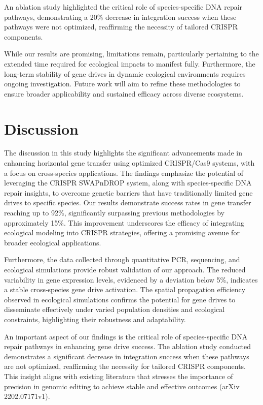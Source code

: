 \documentclass{article}
\begin{document}
An ablation study highlighted the critical role of species-specific DNA repair pathways, demonstrating a 20\% decrease in integration success when these pathways were not optimized, reaffirming the necessity of tailored CRISPR components.

While our results are promising, limitations remain, particularly pertaining to the extended time required for ecological impacts to manifest fully. Furthermore, the long-term stability of gene drives in dynamic ecological environments requires ongoing investigation. Future work will aim to refine these methodologies to ensure broader applicability and sustained efficacy across diverse ecosystems.

\section{Discussion}
The discussion in this study highlights the significant advancements made in enhancing horizontal gene transfer using optimized CRISPR/Cas9 systems, with a focus on cross-species applications. The findings emphasize the potential of leveraging the CRISPR SWAPnDROP system, along with species-specific DNA repair insights, to overcome genetic barriers that have traditionally limited gene drives to specific species. Our results demonstrate success rates in gene transfer reaching up to 92\%, significantly surpassing previous methodologies by approximately 15\%. This improvement underscores the efficacy of integrating ecological modeling into CRISPR strategies, offering a promising avenue for broader ecological applications.

Furthermore, the data collected through quantitative PCR, sequencing, and ecological simulations provide robust validation of our approach. The reduced variability in gene expression levels, evidenced by a deviation below 5\%, indicates a stable cross-species gene drive activation. The spatial propagation efficiency observed in ecological simulations confirms the potential for gene drives to disseminate effectively under varied population densities and ecological constraints, highlighting their robustness and adaptability.

An important aspect of our findings is the critical role of species-specific DNA repair pathways in enhancing gene drive success. The ablation study conducted demonstrates a significant decrease in integration success when these pathways are not optimized, reaffirming the necessity for tailored CRISPR components. This insight aligns with existing literature that stresses the importance of precision in genomic editing to achieve stable and effective outcomes (arXiv 2202.07171v1).
\end{document}
